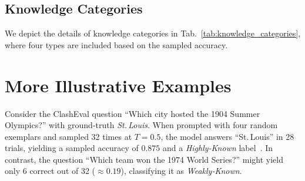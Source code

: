 \documentclass[11pt]{article}
\begin{document}
\begin{table}[th]
  \centering
  \caption{Knowledge qualification categories based on the sampled recall rate from 32 completions at \(T = 0.5\). This categorization adapts the schema from \textsc{SliCK}~\citep{gekhman2024does}.}
  \label{tab:knowledge_categories}
\end{table}
\subsection{Knowledge Categories} 
We depict the details of knowledge categories in Tab.~\ref{tab:knowledge_categories}, where four types are included based on the sampled accuracy. 


\section{More Illustrative Examples}
\label{sec:examples}
Consider the ClashEval question “Which city hosted the 1904 Summer Olympics?” with ground‑truth \emph{St.\,Louis}.  When prompted with four random exemplars and sampled 32 times at $T=0.5$, the model answers “St.\,Louis” in 28 trials, yielding a sampled accuracy of $0.875$ and a \emph{Highly‑Known} label~\cite{wu2024clasheval}.  In contrast, the question “Which team won the 1974 World Series?” might yield only 6 correct out of 32 ($\approx0.19$), classifying it as \emph{Weakly‑Known}.
\end{document}
